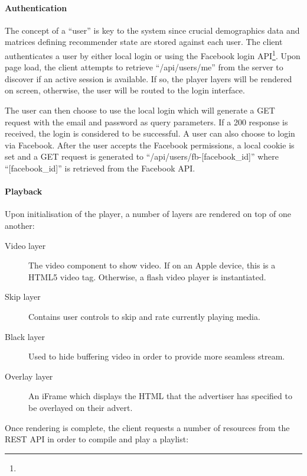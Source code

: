 \paragraph{Authentication}

The concept of a ``user'' is key to the system since crucial demographics data and matrices defining recommender state are stored against each user. The client authenticates a user by either local login or using the Facebook login API\footnote{}. Upon page load, the client attempts to retrieve ``/api/users/me'' from the server to discover if an active session is available. If so, the player layers will be rendered on screen, otherwise, the user will be routed to the login interface.

The user can then choose to use the local login which will generate a GET request with the email and password as query parameters. If a 200 response is received, the login is considered to be successful. A user can also choose to login via Facebook. After the user accepts the Facebook permissions, a local cookie is set and a GET request is generated to ``/api/users/fb-[facebook\_id]'' where ``[facebook\_id]'' is retrieved from the Facebook API.

\paragraph{Playback}

Upon initialisation of the player, a number of layers are rendered on top of one another:

\begin{description}
	\item[Video layer] The video component to show video. If on an Apple device, this is a HTML5 video tag. Otherwise, a flash video player is instantiated.
	\item[Skip layer] Contains user controls to skip and rate currently playing media.
	\item[Black layer] Used to hide buffering video in order to provide more seamless stream.
	\item[Overlay layer] An iFrame which displays the HTML that the advertiser has specified to be overlayed on their advert.
\end{description}

Once rendering is complete, the client requests a number of resources from the REST API in order to compile and play a playlist:

